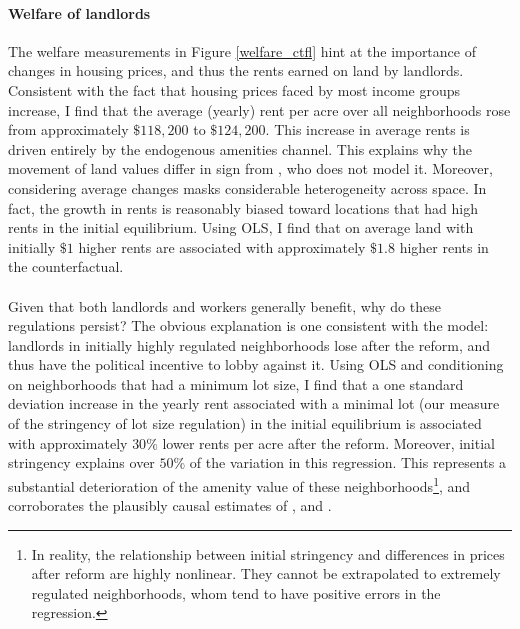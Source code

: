 \documentclass[]{article}
\begin{document}
\paragraph*{Welfare of landlords} The welfare measurements in Figure \ref{welfare_ctfl} hint at the importance of changes in housing prices, and thus the rents earned on land by landlords. Consistent with the fact that housing prices faced by most income groups increase,  I find that the average (yearly) rent per acre over all neighborhoods rose from approximately $\$118,200$ to $\$124,200$. This increase in average rents is driven entirely by the endogenous amenities channel. This explains why the movement of land values differ in sign from \cite{parkho}, who does not model it. Moreover, considering average changes masks considerable heterogeneity across space. In fact, the growth in rents is reasonably biased toward locations that had high rents in the initial equilibrium. Using OLS, I find that on average land with initially $\$1$ higher rents are associated with approximately $\$1.8$ higher rents in the counterfactual. 

\paragraph*{}
Given that both landlords and workers generally benefit, why do these regulations persist? The obvious explanation is one consistent with the model: landlords in initially highly regulated neighborhoods lose after the reform, and thus have the political incentive to lobby against it. Using OLS and conditioning on neighborhoods that had a minimum lot size, I find that a one standard deviation increase in the yearly rent associated with a minimal lot (our measure of the stringency of lot size regulation) in the initial equilibrium is associated with approximately $30\%$ lower rents per acre after the reform. Moreover, initial stringency explains over $50\%$ of the variation in this regression. This represents a substantial deterioration of the amenity value of these neighborhoods\footnote{In reality, the relationship between initial stringency and differences in prices after reform are highly nonlinear. They cannot be extrapolated to extremely regulated neighborhoods, whom tend to have positive errors in the regression.}, and corroborates the plausibly causal estimates of  \cite{Song}, \cite{kulka} and \cite{KSC}. 
\end{document}
